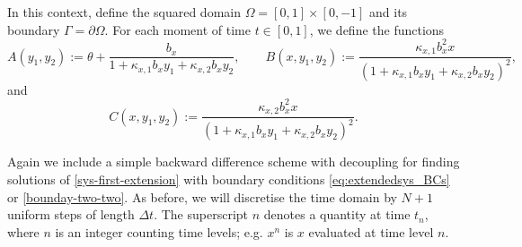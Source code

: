 \documentclass[11pt]{article}
\numberwithin{equation}{section}
\begin{document}
In this context, define the squared domain \( \Omega = [0,1] \times [0,-1]\) and its boundary \( \Gamma = \partial \Omega\). For each moment of time \(t\in [0,1]\), we define the functions 
\[
    A(y_1, y_2) := \theta + \frac{b_x}{1 + \kappa_{x,1} b_{x} y_1 + \kappa_{x,2} b_{x} y_2},
    \qquad
    B(x, y_1, y_2) := \frac{\kappa_{x,1} b_x^2 x}{(1 + \kappa_{x,1} b_{x} y_1 + \kappa_{x,2} b_{x} y_2 )^2},
\]
and
\[
    C(x, y_1, y_2) := \frac{\kappa_{x,2} b_x^2 x}{(1 + \kappa_{x,1} b_{x} y_1 + \kappa_{x,2} b_{x} y_2 )^2}.
\]




Again we include a simple backward difference scheme with decoupling for finding solutions of \eqref{sys-first-extension} with boundary conditions \eqref{eq:extendedsys_BCs} or \eqref{bounday-two-two}. As before, we will discretise the time domain by \(N+1\) uniform steps of length \(\Delta t\). The superscript $n$ denotes a quantity at time $t_n$, where $n$ is an integer counting time levels; e.g. $x^n$ is $x$ evaluated at time level $n$. 



\end{document}
